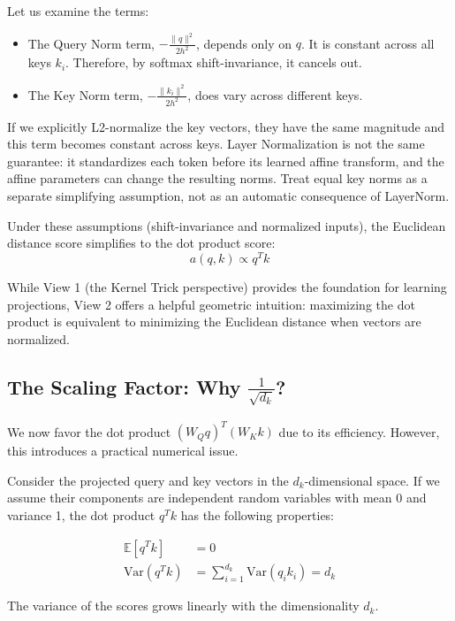 \documentclass{article}
\begin{document}
Let us examine the terms:
\begin{itemize}
\item The Query Norm term, $-\frac{\|q\|^2}{2h^2}$, depends only on $q$. It is constant across all keys $k_i$. Therefore, by softmax shift-invariance, it cancels out.
\item The Key Norm term, $-\frac{\|k_i\|^2}{2h^2}$, does vary across different keys.
\end{itemize}

If we explicitly L2-normalize the key vectors, they have the same magnitude and this
term becomes constant across keys. Layer Normalization is not the same guarantee: it
standardizes each token before its learned affine transform, and the affine parameters
can change the resulting norms. Treat equal key norms as a separate simplifying
assumption, not as an automatic consequence of LayerNorm.

Under these assumptions (shift-invariance and normalized inputs), the Euclidean distance score simplifies to the dot product score:
\begin{equation}
a(q, k) \propto q^T k
\end{equation}

While View 1 (the Kernel Trick perspective) provides the foundation for learning projections, View 2 offers a helpful geometric intuition: maximizing the dot product is equivalent to minimizing the Euclidean distance when vectors are normalized.

\subsection{The Scaling Factor: Why $\frac{1}{\sqrt{d_k}}$?}

We now favor the dot product $(W_Q q)^T (W_K k)$ due to its efficiency. However, this introduces a practical numerical issue.

Consider the projected query and key vectors in the $d_k$-dimensional space. If we assume their components are independent random variables with mean 0 and variance 1, the dot product $q^T k$ has the following properties:

\begin{align}
\mathbb{E}[q^T k] &= 0 \\
\text{Var}(q^T k) &= \sum_{i=1}^{d_k} \text{Var}(q_i k_i) = d_k
\end{align}

The variance of the scores grows linearly with the dimensionality $d_k$.
\end{document}
